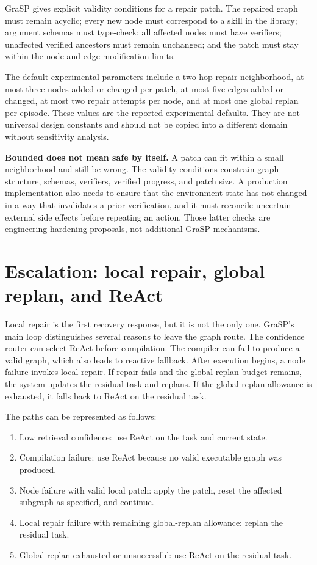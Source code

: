 GraSP gives explicit validity conditions for a repair patch. The repaired graph must remain acyclic; every new node must correspond to a skill in the library; argument schemas must type-check; all affected nodes must have verifiers; unaffected verified ancestors must remain unchanged; and the patch must stay within the node and edge modification limits.\autocite{xia2026grasp}

The default experimental parameters include a two-hop repair neighborhood, at most three nodes added or changed per patch, at most five edges added or changed, at most two repair attempts per node, and at most one global replan per episode. These values are the reported experimental defaults. They are not universal design constants and should not be copied into a different domain without sensitivity analysis.\autocite{xia2026grasp}

\begin{warningbox}
\textbf{Bounded does not mean safe by itself.} A patch can fit within a small neighborhood and still be wrong. The validity conditions constrain graph structure, schemas, verifiers, verified progress, and patch size. A production implementation also needs to ensure that the environment state has not changed in a way that invalidates a prior verification, and it must reconcile uncertain external side effects before repeating an action. Those latter checks are engineering hardening proposals, not additional GraSP mechanisms.
\end{warningbox}

\section{Escalation: local repair, global replan, and ReAct}
\label{sec:ch17-escalation}

Local repair is the first recovery response, but it is not the only one. GraSP's main loop distinguishes several reasons to leave the graph route. The confidence router can select ReAct before compilation. The compiler can fail to produce a valid graph, which also leads to reactive fallback. After execution begins, a node failure invokes local repair. If repair fails and the global-replan budget remains, the system updates the residual task and replans. If the global-replan allowance is exhausted, it falls back to ReAct on the residual task.\autocite{xia2026grasp}

The paths can be represented as follows:

\begin{enumerate}
  \item Low retrieval confidence: use ReAct on the task and current state.
  \item Compilation failure: use ReAct because no valid executable graph was produced.
  \item Node failure with valid local patch: apply the patch, reset the affected subgraph as specified, and continue.
  \item Local repair failure with remaining global-replan allowance: replan the residual task.
  \item Global replan exhausted or unsuccessful: use ReAct on the residual task.
\end{enumerate}

